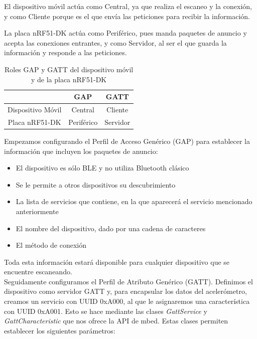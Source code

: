El dispositivo móvil actúa como Central, ya que realiza el escaneo y la conexión, y como Cliente porque es el que envía las peticiones para recibir la información.

La placa nRF51-DK actúa como Periférico, pues manda paquetes de anuncio y acepta las conexiones entrantes, y como Servidor, al ser el que guarda la información y responde a las peticiones.

\begin{table}
	\begin{center}
	\begin{tabular}[c]{|c|c|c|}
        \hline
        & GAP & GATT \\
        \hline
        Dispositivo Móvil & Central & Cliente \\
    	\hline
    	Placa nRF51-DK & Periférico & Servidor \\
    	\hline
	\end{tabular}
    \caption{Roles GAP y GATT del dispositivo móvil y de la placa nRF51-DK}
    \label{tablaRoles5}
   \end{center}
\end{table}

Empezamos configurando el Perfil de Acceso Genérico (GAP) para establecer la información que incluyen los paquetes de anuncio:

\begin{itemize}
	\item El dispositivo es sólo BLE y no utiliza Bluetooth clásico
	\item Se le permite a otros dispositivos su descubrimiento
	\item La lista de servicios que contiene, en la que aparecerá el servicio mencionado anteriormente
	\item El nombre del dispositivo, dado por una cadena de caracteres
	\item El método de conexión
\end{itemize}

Toda esta información estará disponible para cualquier dispositivo que se encuentre escaneando.\\

Seguidamente configuramos el Perfil de Atributo Genérico (GATT). Definimos el dispositivo como servidor GATT y, para encapsular los datos del acelerómetro, creamos un servicio con UUID 0xA000, al que le asignaremos una característica con UUID 0xA001. Esto se hace mediante las clases \textit{GattService} y \textit{GattCharacteristic} que nos ofrece la API de mbed. Estas clases permiten establecer los siguientes parámetros:

